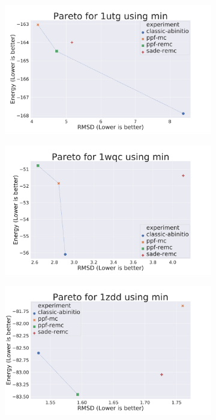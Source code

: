 \begin{figure}
\begin{subfigure}{0.49\linewidth}
  \end{subfigure}
%
  \begin{subfigure}{0.49\linewidth}
    \includegraphics[width=1\linewidth]{Figuras/pareto/1utg_best_by_rmsd_min.pdf}
  \end{subfigure}
%
  \begin{subfigure}{0.49\linewidth}
    \includegraphics[width=1\linewidth]{Figuras/pareto/1wqc_best_by_rmsd_min.pdf}
  \end{subfigure}
%
  \begin{subfigure}{0.49\linewidth}
    \includegraphics[width=1\linewidth]{Figuras/pareto/1zdd_best_by_rmsd_min.pdf}

\end{subfigure}
\end{figure}
